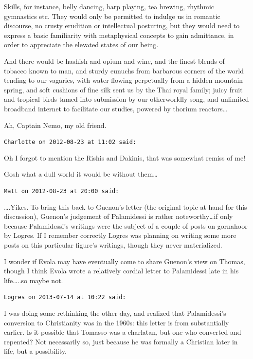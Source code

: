 \begin{footnotesize}
\begin{sffamily}
Skills, for instance, belly dancing, harp playing, tea brewing, rhythmic gymnastics etc. They would only be permitted to indulge us in romantic discourse, no crusty erudition or intellectual posturing, but they would need to express a basic familiarity with metaphysical concepts to gain admittance, in order to appreciate the elevated states of our being.

And there would be hashish and opium and wine, and the finest blends of tobacco known to man, and sturdy eunuchs from barbarous corners of the world tending to our vagaries, with water flowing perpetually from a hidden mountain spring, and soft cushions of fine silk sent us by the Thai royal family; juicy fruit and tropical birds tamed into submission by our otherworldly song, and unlimited broadband internet to facilitate our studies, powered by thorium reactors…

Ah, Captain Nemo, my old friend.


\hfill

\texttt{Charlotte on 2012-08-23 at 11:02 said: }

Oh I forgot to mention the Rishis and Dakinis, that was somewhat remiss of me! 

Gosh what a dull world it would be without them…


\hfill

\texttt{Matt on 2012-08-23 at 20:00 said: }

….Yikes. To bring this back to Guenon's letter (the original topic at hand for this discussion), Guenon's judgement of Palamidessi is rather noteworthy…if only because Palamidessi's writings were the subject of a couple of posts on gornahoor by Logres. If I remember correctly Logres was planning on writing some more posts on this particular figure's writings, though they never materialized.

I wonder if Evola may have eventually come to share Guenon's view on Thomas, though I think Evola wrote a relatively cordial letter to Palamidessi late in his life…..so maybe not.


\hfill

\texttt{Logres on 2013-07-14 at 10:22 said: }

I was doing some rethinking the other day, and realized that Palamidessi's conversion to Christianity was in the 1960s: this letter is from substantially earlier. Is it possible that Tomasso was a charlatan, but one who converted and repented? Not necessarily so, just because he was formally a Christian later in life, but a possibility.



\end{sffamily}
\end{footnotesize}
